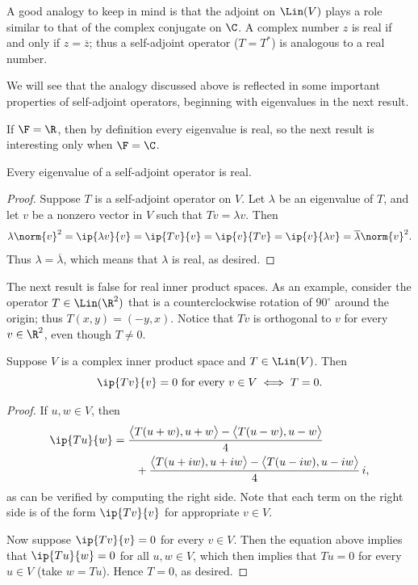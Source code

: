 A good analogy to keep in mind is that the adjoint on $\Lin(V)$ plays a role
similar to that of the complex conjugate on $\C$. A complex number $z$ is real
if and only if $z=\overline{z}$; thus a self-adjoint operator ($T=T^*$) is
analogous to a real number.

%
We will see that the analogy discussed above is reflected in some important
properties of self-adjoint operators, beginning with eigenvalues in the next
result.

If $\F=\R$, then by definition every eigenvalue is real, so the next result is
interesting only when $\F=\C$.

\begin{result}\label{ax:7.12}
Every eigenvalue of a self-adjoint operator is real.
\end{result}

\begin{proof}
Suppose $T$ is a self-adjoint operator on $V$. Let $\lambda$ be an eigenvalue of
$T$, and let $v$ be a nonzero vector in $V$ such that $Tv=\lambda v$. Then
\[ \lambda\norm{v}^2 = \ip{\lambda v}{v} = \ip{Tv}{v} = \ip{v}{Tv}
   = \ip{v}{\lambda v} = \overline{\lambda}\norm{v}^2. \]
Thus $\lambda=\overline{\lambda}$, which means that $\lambda$ is real, as
desired.
\end{proof}

The next result is false for real inner product spaces. As an example, consider
the operator $T\in\Lin(\R^2)$ that is a counterclockwise rotation of $90^\circ$
around the origin; thus $T(x,y)=(-y,x)$. Notice that $Tv$ is orthogonal to $v$
for every $v\in\R^2$, even though $T\ne0$.

\begin{result}[$Tv$ is orthogonal to $v$ for all $v$ $\iff$ $T=0$ (assuming
$\F=\C$)]\label{ax:7.13}
Suppose $V$ is a complex inner product space and $T\in\Lin(V)$. Then
\[ \ip{Tv}{v}=0 \text{ for every } v\in V \iff T=0. \]
\end{result}

\begin{proof}
If $u,w\in V$, then
\begin{align*}
\ip{Tu}{w} &= \frac{\bigl\langle T(u+w),u+w\bigr\rangle
                    -\bigl\langle T(u-w),u-w\bigr\rangle}{4}\\
  &\qquad+\frac{\bigl\langle T(u+iw),u+iw\bigr\rangle
                -\bigl\langle T(u-iw),u-iw\bigr\rangle}{4}\,i,
\end{align*}
as can be verified by computing the right side. Note that each term on the
right side is of the form $\ip{Tv}{v}$ for appropriate $v\in V$.

Now suppose $\ip{Tv}{v}=0$ for every $v\in V$. Then the equation above implies
that $\ip{Tu}{w}=0$ for all $u,w\in V$, which then implies that $Tu=0$ for every
$u\in V$ (take $w=Tu$). Hence $T=0$, as desired.
\end{proof}

